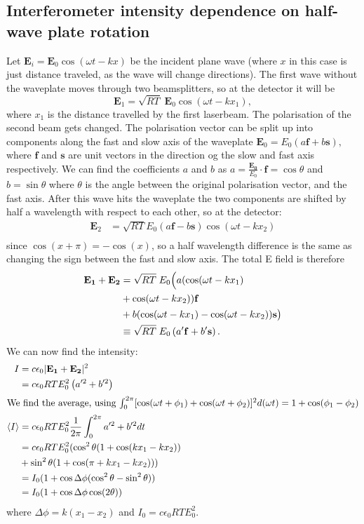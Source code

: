\subsection{Interferometer intensity dependence on half-wave plate rotation}
Let $\mathbf{E}_i = \mathbf{E}_0\cos(\omega t - kx)$ be the incident plane wave (where $x$ in this case is just distance traveled, as the wave will change directions).
The first wave without the waveplate moves through two beamsplitters, so at the detector it will be
\[\mathbf{E}_1 = \sqrt{R T} \;\mathbf{E}_0 \cos(\omega t - kx_1),\]
where $x_1$ is the distance travelled by the first laserbeam. 
The polarisation of the second beam gets changed.
The polarisation vector can be split up into components along the fast and slow axis of the waveplate
$\mathbf{E}_0 = E_0 (a \mathbf{f} + b \mathbf{s}),$
where $\mathbf{f}$ and $\mathbf{s}$ are unit vectors in the direction og the slow and fast axis respectively.
We can find the coefficients $a$ and $b$ as $a = \frac{\mathbf{E_0}}{E_0} \cdot \mathbf{f} = \cos\theta$ and $b = \sin\theta$ where $\theta$ is the angle between the original polarisation vector,
and the fast axis.
After this wave hits the waveplate the two components are shifted by half a wavelength with respect to each other, so at the detector:
\begin{align*}
    \mathbf{E}_2 &= \sqrt{RT}E_0 (a \mathbf{f} - b \mathbf{s})\cos(\omega t - kx_2) \\
\end{align*}
since $\cos(x + \pi) = -\cos(x)$, so a half wavelength difference is the same as changing the sign between the fast and slow axis.
The total E field is therefore
\begin{align*}
    \mathbf{E_1} + \mathbf{E_2} &= \sqrt{RT}\; E_0\Bigl(a(\cos(\omega t - kx_1)\\
    &+ \cos(\omega t - kx_2))\mathbf{f} \\
    &+ b(\cos(\omega t - kx_1) - \cos(\omega t - kx_2))\mathbf{s}\bigr) \\
    &\equiv \sqrt{RT}\;E_0 \left( a'\mathbf{f} + b'\mathbf{s} \right).
\end{align*}
We can now find the intensity:
\begin{align}
    I &= c \epsilon_0 |\mathbf{E_1} + \mathbf{E_2}|^2 \nonumber \\
    &= c \epsilon_0 RT E_0^2 \left( a'^2 + b'^2 \right) \nonumber \\
    \intertext{We find the average, using $\int_0^{2\pi} [\cos(\omega t + \phi_1) + \cos(\omega t + \phi_2)]^2 d(\omega t) = 1 + \cos(\phi_1 - \phi_2)$}
    \langle I \rangle &= c \epsilon_0 RT E_0^2 \frac{1}{2\pi}\int_0^{2\pi} a'^2 + b'^2 dt  \nonumber \\
    &= c \epsilon_0 RT E_0^2 (\cos^2\theta (1 + \cos(kx_1 - kx_2)) \nonumber \\
    &+ \sin^2\theta (1 + \cos(\pi + kx_1 - kx_2))) \nonumber \\
    &= I_0 (1 + \cos\Delta \phi (\cos^2\theta - \sin^2\theta)) \nonumber \\
    &= I_0 (1 + \cos\Delta \phi \cos(2\theta)) \label{RetardedIntensity}
\end{align}
where $\Delta \phi = k(x_1 - x_2)$ and $I_0 = c \epsilon_0 RT E_0^2$.